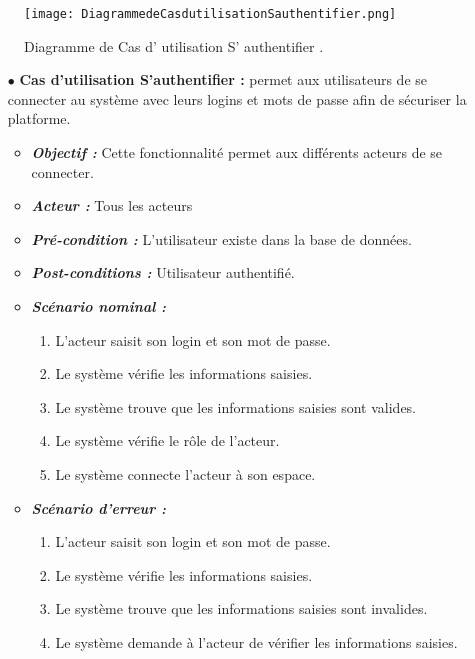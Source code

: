 \begin{figure}[ht]
	\centering
	\texttt{[image: DiagrammedeCasdutilisationSauthentifier.png]}
	\caption{Diagramme de Cas d' utilisation S' authentifier .}
\label{fig:Diagramme de Cas d utilisation S' authentifier }
\end{figure}
\FloatBarrier





\begin{itemize}
	
	\item[$\bullet$] \textbf{Cas d’utilisation S’authentifier :} permet aux utilisateurs de se connecter au système avec leurs logins et mots de passe afin de sécuriser la platforme.
	\medskip
	\begin{itemize}
		\item \textit{\textbf{Objectif :}}  Cette fonctionnalité permet aux différents acteurs de se connecter. 
		
		\item \textit{\textbf{Acteur :}} Tous les acteurs
		
		\item \textit{\textbf{Pré-condition  :}} L’utilisateur existe dans la base de données.
		\item \textit{\textbf{Post-conditions   :}} Utilisateur authentifié.
		\item \textit{\textbf{Scénario nominal :}}
		\begin{enumerate}
			\item L’acteur saisit son login et son mot de passe. 
			\item Le système vérifie les informations saisies. 
			\item Le système trouve que les informations saisies sont valides.  
			\item Le système vérifie le rôle de l’acteur.  
			\item Le système connecte l’acteur à son espace.
		\end{enumerate}
		\item \textit{\textbf{Scénario d'erreur :}} 
		\begin{enumerate}
			\item L’acteur saisit son login et son mot de passe. 
			\item Le système vérifie les informations saisies.   
			\item Le système trouve que les informations saisies sont invalides.  
			\item Le système demande à l’acteur de vérifier les informations saisies.
		\end{enumerate}
	\end{itemize}
	
	\bigskip
	
	
	
	
	
	
	
	
\end{itemize}
\bigskip









